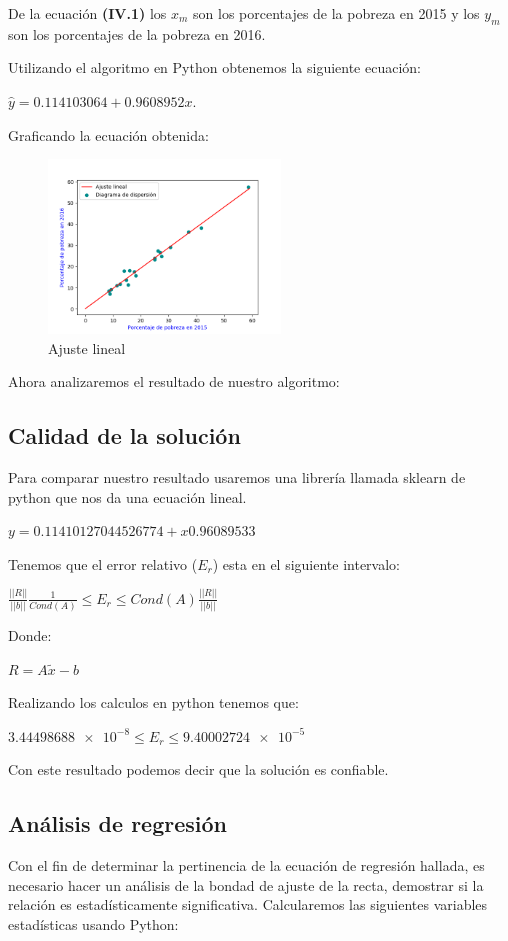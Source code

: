 \documentclass[twocolumn,twoside]{article}
\begin{document}
De la ecuaci\'on \textbf{(IV.1)} los $x_m$ son los porcentajes de la pobreza en 2015 y 
los $y_m$ son los porcentajes de la pobreza en 2016.

Utilizando el algoritmo en Python obtenemos la siguiente ecuaci\'on:\\
\begin{center}
  $\hat y=0.114103064+0.9608952x$. 
\end{center}
Graficando la ecuaci\'on obtenida:
\begin{figure}[H]
  \centering
    \includegraphics[width=0.55\textwidth]{Figure_2}
  \caption{Ajuste lineal}
  \label{figura:ajuste lineal}
\end{figure}

Ahora analizaremos el resultado de nuestro algoritmo:

\subsection{Calidad de la soluci\'on}
Para comparar nuestro resultado usaremos una librer\'ia llamada sklearn de python que nos da
una ecuaci\'on lineal.
\begin{center}
  $y =  0.11410127044526774 +x 0.96089533$
\end{center}
Tenemos que el error relativo ($E_r$) esta en el siguiente intervalo:
\begin{center}
  $\frac{||R||}{||b||} \frac{1}{Cond(A)} \leq E_r \leq Cond(A)\frac{||R||}{||b||}$
\end{center}
Donde:
\begin{center}
    $R=A\tilde{x}-b$
\end{center}
Realizando los calculos en python tenemos que:
\begin{center}
    $\num{3.44498688e-8} \leq E_r\leq \num{9.40002724e-5}$
\end{center}  
 Con este resultado podemos decir que la soluci\'on es confiable.

\subsection{An\'alisis  de regresi\'on}
Con el fin de determinar la pertinencia de la ecuaci\'on de regresi\'on hallada, es necesario hacer
un an\'alisis de la bondad de ajuste de la recta, demostrar si la relaci\'on es estad\'isticamente
significativa.
Calcularemos las siguientes variables estad\'isticas usando Python:
\end{document}
